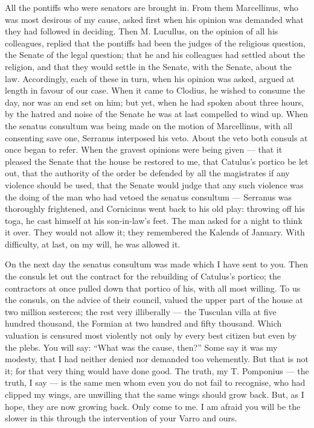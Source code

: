  All the pontiffs who were senators are brought in. From them Marcellinus, who was most desirous of my cause, asked first when his opinion was demanded what they had followed in deciding. Then M. Lucullus, on the opinion of all his colleagues, replied that the pontiffs had been the judges of the religious question, the Senate of the legal question; that he and his colleagues had settled about the religion, and that they would settle in the Senate, with the Senate, about the law. Accordingly, each of these in turn, when his opinion was asked, argued at length in favour of our case. When it came to Clodius, he wished to consume the day, nor was an end set on him; but yet, when he had spoken about three hours, by the hatred and noise of the Senate he was at last compelled to wind up. When the senatus consultum was being made on the motion of Marcellinus, with all consenting save one, Serranus interposed his veto. About the veto both consuls at once began to refer. When the gravest opinions were being given --- that it pleased the Senate that the house be restored to me, that Catulus's portico be let out, that the authority of the order be defended by all the magistrates if any violence should be used, that the Senate would judge that any such violence was the doing of the man who had vetoed the senatus consultum --- Serranus was thoroughly frightened, and Cornicinus went back to his old play: throwing off his toga, he cast himself at his son-in-law's feet. The man asked for a night to think it over. They would not allow it; they remembered the Kalends of January. With difficulty, at last, on my will, he was allowed it.

 On the next day the senatus consultum was made which I have sent to you. Then the consuls let out the contract for the rebuilding of Catulus's portico; the contractors at once pulled down that portico of his, with all most willing. To us the consuls, on the advice of their council, valued the upper part of the house at two million sesterces; the rest very illiberally --- the Tusculan villa at five hundred thousand, the Formian at two hundred and fifty thousand. Which valuation is censured most violently not only by every best citizen but even by the plebs. You will say: ``What was the cause, then?'' Some say it was my modesty, that I had neither denied nor demanded too vehemently. But that is not it; for that very thing would have done good. The truth, my T. Pomponius --- the truth, I say --- is the same men whom even you do not fail to recognise, who had clipped my wings, are unwilling that the same wings should grow back. But, as I hope, they are now growing back. Only come to me. I am afraid you will be the slower in this through the intervention of your Varro and ours.

